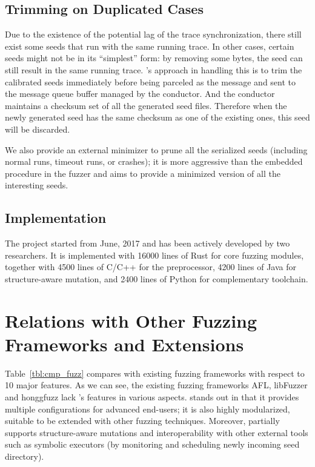  \subsection{Trimming on Duplicated Cases}
Due to the existence of the potential lag of the trace synchronization, there still exist some seeds that run with the same running trace. In other cases, certain seeds might not be in its ``simplest'' form: by removing some bytes, the seed can still result in the same running trace. {\FOT}'s approach in handling this is to trim the calibrated seeds immediately before being parceled as the message and sent to the message queue buffer managed by the conductor. And the conductor maintains a checksum set of all the generated seed files. Therefore when the newly generated seed has the same checksum as one of the existing ones, this seed will be discarded.

We also provide an external minimizer to prune all the serialized seeds (including normal runs, timeout runs, or crashes); it is more aggressive than the embedded procedure in the fuzzer and aims to provide a minimized version of all the interesting seeds.
 

\subsection{Implementation}\label{sec:fot-impl}

The {\FOT} project started from June, 2017 and has been actively developed by two researchers. It is implemented with 16000 lines of Rust for core fuzzing modules, together with 4500 lines of C/C++ for the preprocessor, 4200 lines of Java for structure-aware mutation, and 2400 lines of Python for complementary toolchain.
  

\section{Relations with Other Fuzzing Frameworks and Extensions}





Table~\ref{tbl:cmp_fuzz} compares {\FOT} with existing fuzzing frameworks with respect to 10 major features. As we can see, the existing fuzzing frameworks AFL, libFuzzer and honggfuzz lack \FOT's features in various aspects. {\FOT} stands out in that it provides multiple configurations for advanced end-users; it is also highly modularized, suitable to be extended with other fuzzing techniques. Moreover, {\FOT} partially supports structure-aware mutations and interoperability with other external tools such as symbolic executors (by monitoring and scheduling newly incoming seed directory).


